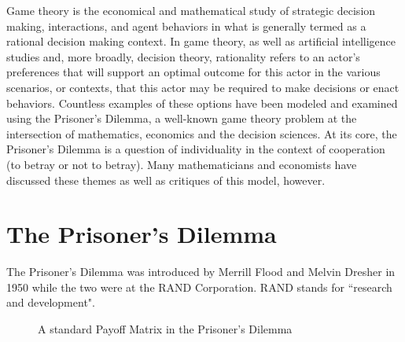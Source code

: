 \documentclass[12pt,twoside]{article}
\begin{document}
Game theory is the economical and mathematical study of strategic decision making, interactions, and agent behaviors in what is generally termed as a rational decision making context. In game theory, as well as artificial intelligence studies and, more broadly, decision theory, rationality refers to an actor's preferences that will support an optimal outcome for this actor in the various scenarios, or contexts, that this actor may be required to make decisions or enact behaviors. Countless examples of these options have been modeled and examined using the Prisoner's Dilemma, a well-known game theory problem at the intersection of mathematics, economics and the decision sciences. At its core, the Prisoner's Dilemma is a question of individuality in the context of cooperation (to betray or not to betray). Many mathematicians and economists have discussed these themes as well as critiques of this model, however.

\section{The Prisoner's Dilemma}

\noindent The Prisoner's Dilemma was introduced by Merrill Flood and Melvin Dresher in 1950 while the two were at the RAND Corporation. RAND stands for ``research and development".


\begin{figure}[h]
\centering
\caption{A standard Payoff Matrix in the Prisoner's Dilemma}
\label{Collective action problem in the Prisoners' Dilemma}
\end{figure}
\end{document}
